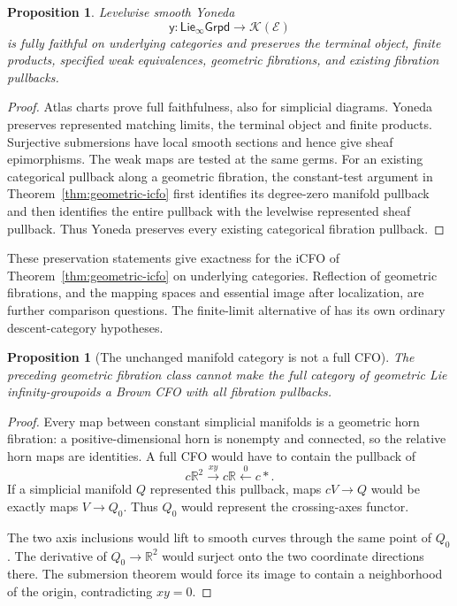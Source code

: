 \documentclass[12pt]{amsart}
\newtheorem{prop}[thm]{Proposition}
\theoremstyle{definition}
\theoremstyle{remark}
\numberwithin{equation}{section}
\newcommand{\R}{\mathbb R}
\newcommand{\E}{\mathcal E}
\newcommand{\KSh}{\mathcal K(\E)}
\newcommand{\LieGpd}{\mathsf{Lie}_{\infty}\mathsf{Grpd}}
\newcommand{\y}{\mathsf y}
\begin{document}
\begin{prop}\label{prop:geometric-yoneda}
Levelwise smooth Yoneda
\[
 \y:\LieGpd\longrightarrow\KSh
\]
is fully faithful on underlying categories and
preserves the terminal object, finite products,
specified weak equivalences, geometric fibrations,
and existing fibration pullbacks.
\end{prop}

\begin{proof}
Atlas charts prove full faithfulness, also for
simplicial diagrams. Yoneda preserves represented
matching limits, the terminal object and finite products.
Surjective
submersions have local smooth sections and hence
give sheaf epimorphisms. The weak maps are tested
at the same germs.
For an existing categorical pullback along a geometric
fibration, the constant-test argument in
Theorem~\ref{thm:geometric-icfo} first identifies its
degree-zero manifold pullback and then identifies
the entire pullback with the levelwise represented
sheaf pullback. Thus Yoneda preserves every existing
categorical fibration pullback.
\end{proof}

These preservation statements give exactness for the iCFO of
Theorem~\ref{thm:geometric-icfo} on underlying categories.
Reflection of geometric fibrations, and the mapping spaces
and essential image after localization, are further
comparison questions.
The finite-limit alternative of
\cite{BehrendGetzler2017} has its own ordinary
descent-category hypotheses.

\begin{prop}[The unchanged manifold category is not a full CFO]
\label{prop:crossing-axes}
The preceding geometric fibration class cannot make
the full category of geometric Lie infinity-groupoids
a Brown CFO with all fibration pullbacks.
\end{prop}

\begin{proof}
Every map between constant simplicial manifolds is a
geometric horn fibration: a positive-dimensional horn
is nonempty and connected, so the relative horn maps
are identities. A full CFO would have to contain the
pullback of
\[
 c\R^2\xrightarrow{xy}c\R\xleftarrow{0}c*.
\]
If a simplicial manifold $Q$ represented this pullback,
maps $cV\to Q$ would be exactly maps $V\to Q_0$.
Thus $Q_0$ would represent the crossing-axes functor.

The two axis inclusions would lift to smooth curves
through the same point of $Q_0$. The derivative of
$Q_0\to\R^2$ would surject onto the two coordinate
directions there. The submersion theorem would force
its image to contain a neighborhood of the origin,
contradicting $xy=0$.
\end{proof}
\end{document}
